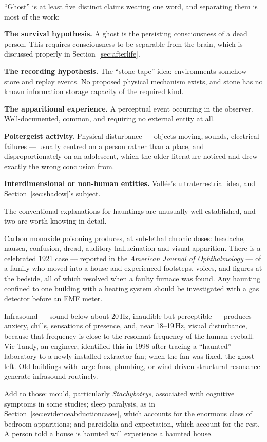 ``Ghost'' is at least five distinct claims wearing one word, and separating them is most of the
work:

\textbf{The survival hypothesis.} A ghost is the persisting consciousness of a dead person.
This requires consciousness to be separable from the brain, which is discussed properly in
Section~\ref{sec:afterlife}.

\textbf{The recording hypothesis.} The ``stone tape'' idea: environments somehow store and
replay events. No proposed physical mechanism exists, and stone has no known information
storage capacity of the required kind.

\textbf{The apparitional experience.} A perceptual event occurring in the observer.
Well-documented, common, and requiring no external entity at all.

\textbf{Poltergeist activity.} Physical disturbance --- objects moving, sounds, electrical
failures --- usually centred on a person rather than a place, and disproportionately on an
adolescent, which the older literature noticed and drew exactly the wrong conclusion from.

\textbf{Interdimensional or non-human entities.} Vall\'ee's ultraterrestrial idea, and
Section~\ref{sec:shadow}'s subject.

The conventional explanations for hauntings are unusually well established, and two are worth
knowing in detail.

Carbon monoxide poisoning produces, at sub-lethal chronic doses: headache, nausea, confusion,
dread, auditory hallucination and visual apparition. There is a celebrated 1921 case ---
reported in the \emph{American Journal of Ophthalmology} --- of a family who moved into a house
and experienced footsteps, voices, and figures at the bedside, all of which resolved when a
faulty furnace was found. Any haunting confined to one building with a heating system should be
investigated with a gas detector before an EMF meter.

Infrasound --- sound below about 20\,Hz, inaudible but perceptible --- produces anxiety,
chills, sensations of presence, and, near 18--19\,Hz, visual disturbance, because that
frequency is close to the resonant frequency of the human eyeball. Vic Tandy, an engineer,
identified this in 1998 after tracing a ``haunted'' laboratory to a newly installed extractor
fan; when the fan was fixed, the ghost left. Old buildings with large fans, plumbing, or
wind-driven structural resonance generate infrasound routinely.

Add to those: mould, particularly \emph{Stachybotrys}, associated with cognitive symptoms in
some studies; sleep paralysis, as in Section~\ref{sec:evidenceabductioncases}, which accounts for the enormous class of
bedroom apparitions; and pareidolia and expectation, which account for the rest. A person told
a house is haunted will experience a haunted house.

